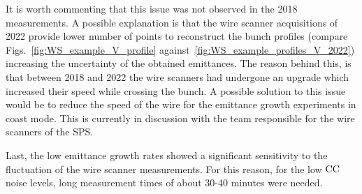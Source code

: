 It is worth commenting that this issue was not observed in the 2018 measurements. A possible explanation is that the wire scanner acquisitions of 2022 provide lower number of points to reconstruct the bunch profiles (compare Figs.~\ref{fig:WS_example_V_profile} against~\ref{fig:WS_example_profiles_V_2022}) increasing the uncertainty of the obtained emittances. The reason behind this, is that between 2018 and 2022 the wire scanners had undergone an upgrade which increased their speed while crossing the bunch. A possible solution to this issue would be to reduce the speed of the wire for the emittance growth experiments in coast mode. This is currently in discussion with the team responsible for the wire scanners of the SPS.


Last, the low emittance growth rates showed a significant sensitivity to the fluctuation of the wire scanner measurements. For this reason, for the low ${\mathrm{CC}}$ noise levels, long measurement times of about 30-40 minutes were needed.





